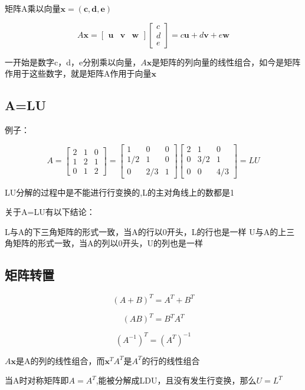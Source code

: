 \documentclass{ctexart}
\begin{document}
	矩阵A乘以向量\(\bm{x} = (\bm{c, d, e})\)
	
	\[A\bm{x}= \begin{bmatrix}
	\bm{u} & \bm{v} & \bm{w}
	\end{bmatrix} \begin{bmatrix}
	c \\
	d \\
	e
	\end{bmatrix} = c\bm{u}+d\bm{v}+e\bm{w}\]
	
	一开始是数字c，d，e分别乘以向量，\(A\bm{x}\)是矩阵的列向量的线性组合，如今是矩阵作用于这些数字，就是矩阵A作用于向量\(\bm{x}\)
	
	
	\subsection{A=LU}
	
	例子：
	
	\[A=\begin{bmatrix}
	2 & 1 & 0 \\
	1 & 2 & 1 \\
	0 & 1 & 2
	\end{bmatrix} = \begin{bmatrix}
	1 & 0 & 0 \\
	1/2 & 1 & 0 \\
	0 & 2/3 & 1
	\end{bmatrix}\begin{bmatrix}
	2 & 1 & 0 \\
	0 & 3/2 & 1 \\
	0 & 0 & 4/3
	\end{bmatrix} = LU\]
	
	LU分解的过程中是不能进行行变换的,L的主对角线上的数都是1
	
	关于A=LU有以下结论：
	
	L与A的下三角矩阵的形式一致，当A的行以0开头，L的行也是一样
	U与A的上三角矩阵的形式一致，当A的列以0开头，U的列也是一样
	
	\subsection{矩阵转置}
	
	\[(A+B)^T = A^T + B^T\]
	
	\[(AB)^T = B^TA^T\]
	
	\[(A^{-1})^T = (A^T)^{-1}\]
	
	\(A\bm{x}\)是A的列的线性组合，而\(\bm{x}^TA^T\)是\(A^T\)的行的线性组合
	
	当A时对称矩阵即\(A=A^T\),能被分解成LDU，且没有发生行变换，那么\(U=L^T\)
	
\end{document}

